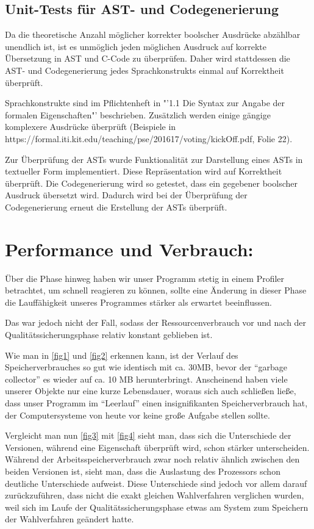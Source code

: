 \documentclass[a4paper]{scrreprt}
\begin{document}
\section{Unit-Tests für AST- und Codegenerierung}
Da die theoretische Anzahl möglicher korrekter boolscher Ausdrücke abzählbar unendlich ist, ist es unmöglich jeden möglichen Ausdruck auf korrekte Übersetzung in AST und C-Code zu überprüfen. Daher wird stattdessen die AST- und Codegenerierung jedes Sprachkonstrukts einmal auf Korrektheit überprüft. 

Sprachkonstrukte sind im Pflichtenheft in "'1.1 Die Syntax zur Angabe der formalen Eigenschaften"' beschrieben. Zusätzlich werden einige gängige komplexere Ausdrücke überprüft (Beispiele in https://formal.iti.kit.edu/teaching/pse/201617/voting/kickOff.pdf, Folie 22). 

Zur Überprüfung der ASTs wurde Funktionalität zur Darstellung eines ASTs in textueller Form implementiert. Diese Repräsentation wird auf Korrektheit überprüft. Die Codegenerierung wird so getestet, dass ein gegebener boolscher Ausdruck übersetzt wird. Dadurch wird bei der Überprüfung der Codegenerierung erneut die Erstellung der ASTs überprüft. 

\chapter{Performance und Verbrauch:}
Über die Phase hinweg haben wir unser Programm stetig in einem Profiler betrachtet, um
schnell reagieren zu können, sollte eine Änderung in dieser Phase die
Lauffähigkeit unseres Programmes stärker als erwartet beeinflussen.

Das war jedoch nicht der Fall, sodass der Ressourcenverbrauch vor und nach der
Qualitätssicherungsphase relativ konstant geblieben ist.

Wie man in \ref{fig1} und \ref{fig2} erkennen kann, ist der Verlauf des
Speicherverbrauches so gut wie identisch mit ca. 30MB, bevor der "`garbage
collector"' es wieder auf ca. 10 MB herunterbringt. Anscheinend haben viele
unserer Objekte nur eine kurze Lebensdauer, woraus sich auch schließen ließe,
dass unser Programm im "`Leerlauf"' einen insignifikanten Speicherverbrauch hat,
der Computersysteme von heute vor keine große Aufgabe stellen sollte.

Vergleicht man nun \ref{fig3} mit \ref{fig4} sieht man, dass sich die
Unterschiede der Versionen, während eine Eigenschaft überprüft wird, schon
stärker unterscheiden. Während der Arbeitsspeicherverbrauch zwar noch relativ
ähnlich zwischen den beiden Versionen ist, sieht man, dass die Auslastung des
Prozessors schon deutliche Unterschiede aufweist. Diese Unterschiede sind jedoch vor allem darauf
zurückzuführen, dass nicht die exakt gleichen Wahlverfahren verglichen
wurden, weil sich im Laufe der Qualitätssicherungsphase etwas am System zum
Speichern der Wahlverfahren geändert hatte.
\end{document}
